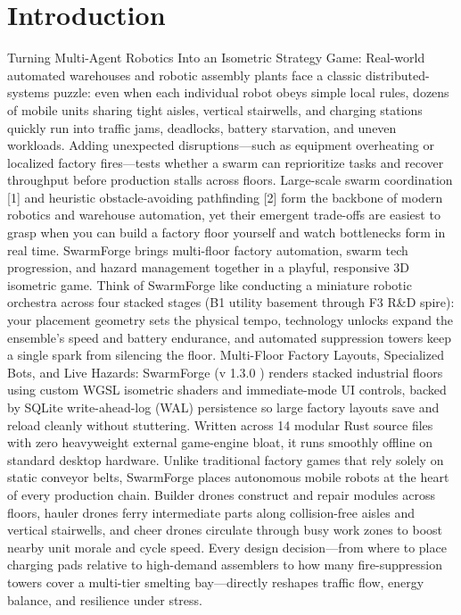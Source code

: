 \documentclass[10pt,letterpaper]{article}
\begin{document}
\section{Introduction}
Turning Multi-Agent Robotics Into an Isometric Strategy Game: Real-world automated warehouses and robotic assembly plants face a classic distributed-systems puzzle: even when each individual robot obeys simple local rules, dozens of mobile units sharing tight aisles, vertical stairwells, and charging stations quickly run into traffic jams, deadlocks, battery starvation, and uneven workloads. Adding unexpected disruptions---such as equipment overheating or localized factory fires---tests whether a swarm can reprioritize tasks and recover throughput before production stalls across floors. Large-scale swarm coordination [1] and heuristic obstacle-avoiding pathfinding [2] form the backbone of modern robotics and warehouse automation, yet their emergent trade-offs are easiest to grasp when you can build a factory floor yourself and watch bottlenecks form in real time. SwarmForge brings multi-floor factory automation, swarm tech progression, and hazard management together in a playful, responsive 3D isometric game. Think of SwarmForge like conducting a miniature robotic orchestra across four stacked stages (B1 utility basement through F3 R\&D spire): your placement geometry sets the physical tempo, technology unlocks expand the ensemble's speed and battery endurance, and automated suppression towers keep a single spark from silencing the floor. Multi-Floor Factory Layouts, Specialized Bots, and Live Hazards: SwarmForge (v 1.3.0 ) renders stacked industrial floors using custom WGSL isometric shaders and immediate-mode UI controls, backed by SQLite write-ahead-log (WAL) persistence so large factory layouts save and reload cleanly without stuttering. Written across 14 modular Rust source files with zero heavyweight external game-engine bloat, it runs smoothly offline on standard desktop hardware. Unlike traditional factory games that rely solely on static conveyor belts, SwarmForge places autonomous mobile robots at the heart of every production chain. Builder drones construct and repair modules across floors, hauler drones ferry intermediate parts along collision-free aisles and vertical stairwells, and cheer drones circulate through busy work zones to boost nearby unit morale and cycle speed. Every design decision---from where to place charging pads relative to high-demand assemblers to how many fire-suppression towers cover a multi-tier smelting bay---directly reshapes traffic flow, energy balance, and resilience under stress.
\end{document}
